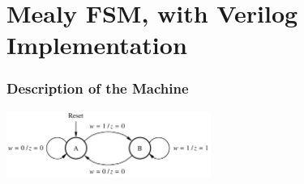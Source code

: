 \documentclass[12pt,openany]{book}
\begin{document}
\section{Mealy FSM, with Verilog Implementation}
\subsubsection*{Description of the Machine}
\begin{center}
	\includegraphics[width=0.5\textwidth]{circuits/17.2.png}
\end{center}
\end{document}
